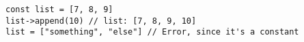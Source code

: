 \vspace{-2.5em}
\begin{center}
\begin{minipage}[t]{0.8\textwidth}
\begin{listing}[H]
\begin{spacing}{0.6}
\begin{verbatim}
const list = [7, 8, 9]
list->append(10) // list: [7, 8, 9, 10]
list = ["something", "else"] // Error, since it's a constant
\end{verbatim}
\end{spacing}
\end{listing}
\end{minipage}
\end{center}
\vspace{-1.8em}
